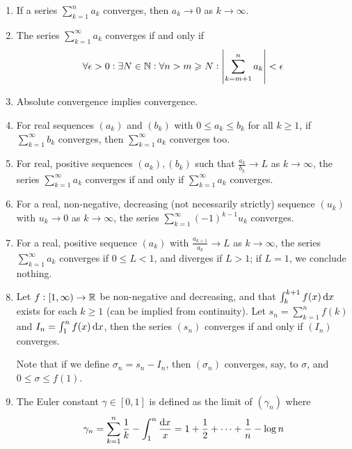 \documentclass{styles/note}
\begin{document}
  \begin{enumerate}[label=(\alph*)]
    \item If a series $\sum_{k=1}^n a_k$ converges, then $a_k \to 0$ as $k \to \infty$.
    
    \item {}
      The series $\sum_{k=1}^\infty a_k$ converges if and only if
      \begin{equation}
        \forall \epsilon > 0 : \exists N \in \mathbb{N} : \forall n > m \geqslant N : \abs{\sum_{k=m+1}^n a_k} < \epsilon
      \end{equation}
    
    \item Absolute convergence implies convergence.
    
    \item {}
      For real sequences $(a_k)$ and $(b_k)$ with $0 \leqslant a_k \leqslant b_k$ for all $k \geqslant 1$, if $\sum_{k=1}^\infty b_k$ converges, then $\sum_{k=1}^\infty a_k$ converges too.
    
    \item {}
      For real, positive sequences $(a_k), (b_k)$ such that $\frac{a_k}{b_k} \to L$ as $k \to \infty$, the series $\sum_{k=1}^\infty a_k$ converges if and only if $\sum_{k=1}^\infty a_k$ converges.
    
    \item {}
      For a real, non-negative, decreasing (not necessarily strictly) sequence $(u_k)$ with $u_k \to 0$ as $k \to \infty$, the series $\sum_{k=1}^\infty (-1)^{k-1} u_k$ converges.
    
    \item {}
      For a real, positive sequence $(a_k)$ with $\frac{a_{k+1}}{a_k} \to L$ as $k \to \infty$, the series $\sum_{k=1}^\infty a_k$ converges if $0 \leqslant L < 1$, and diverges if $L > 1$; if $L = 1$, we conclude nothing.
    
    \item {}
      Let $f : [1, \infty) \to \mathbb{R}$ be non-negative and decreasing, and that $\int_k^{k+1} f(x) \dif x$ exists for each $k \geqslant 1$ (can be implied from continuity). Let $s_n = \sum_{k=1}^n f(k)$ and $I_n = \int_1^n f(x) \dif x$, then the series $(s_n)$ converges if and only if $(I_n)$ converges.
      
      Note that if we define $\sigma_n = s_n - I_n$, then $(\sigma_n)$ converges, say, to $\sigma$, and $0 \leqslant \sigma \leqslant f(1)$.
    
    \item The Euler constant $\gamma \in [0, 1]$ is defined as the limit of $(\gamma_n)$ where
      \[ \gamma_n = \sum_{k=1}^n \frac{1}{k} - \int_1^n \frac{\dif x}{x} = 1 + \frac{1}{2} + \dots + \frac{1}{n} - \log n \]
  \end{enumerate}
\end{document}
